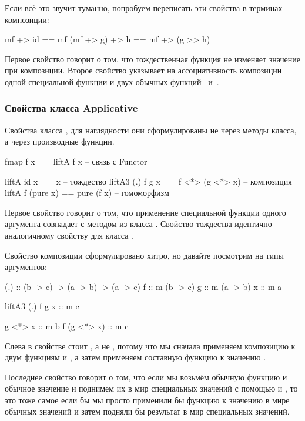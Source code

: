 Если всё это звучит туманно, попробуем переписать эти свойства
в терминах композиции:

\begin{code}
mf +> id         == mf
(mf +> g) +> h   == mf +> (g >> h)
\end{code}

Первое свойство говорит о том, что тождественная функция
не изменяет значение при композиции. Второе свойство указывает на 
ассоциативность композиции одной специальной функции  
и двух обычных функций \mbox{ и }.


\subsubsection{Свойства класса Applicative}

Свойства класса , для наглядности они сформулированы
не через методы класса, а через производные функции.

\begin{code}
fmap f x            == liftA f x             -- связь с Functor

liftA  id x         == x                     -- тождество
liftA3 (.) f g x    == f <*> (g <*> x)       -- композиция 
liftA  f (pure x)   == pure (f x)            -- гомоморфизм
\end{code}

Первое свойство говорит о том, что применение специальной функции
одного аргумента совпадает с методом  из класса .
Свойство тождества идентично аналогичному свойству для класса
. 

Свойство композиции сформулировано хитро, но давайте 
посмотрим на типы аргументов:

\begin{code}
(.) :: (b -> c) -> (a -> b) -> (a -> c)
f   :: m (b -> c)
g   :: m (a -> b)    
x   :: m a

liftA3 (.) f g x :: m c

g <*> x      :: m b
f (g <*> x)  :: m c
\end{code}

Слева в свойстве стоит , а не ,
потому что мы сначала применяем композицию  к двум функциям
 и , а затем применяем составную функцию к значению .

Последнее свойство говорит о том, что если мы возьмём обычную функцию
и обычное значение и поднимем их в мир специальных значений с
помощью  и , то это тоже самое если бы
мы просто применили бы функцию  к значению в мире обычных
значений и затем подняли бы результат в мир специальных значений.


